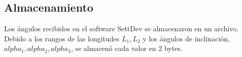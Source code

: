 \newpage
\subsection{Almacenamiento}

Los ángulos recibidos en el software SettDev se almacenaron en un archivo. Debido a los rangos de las longitudes $L_1, L_2$ y los ángulos de inclinación, $alpha_1, alpha_2, alpha_3$, se almacenó cada valor en 2 bytes.